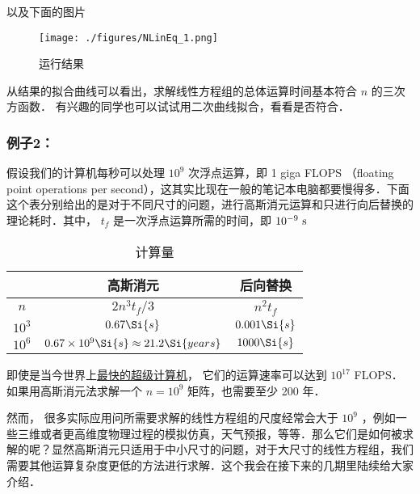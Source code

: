 以及下面的图片

\begin{figure}[ht]
\centering
\texttt{[image: ./figures/NLinEq\_1.png]}
\caption{运行结果} \label{NLinEq_fig1}
\end{figure}

从结果的拟合曲线可以看出，求解线性方程组的总体运算时间基本符合 $n$ 的三次方函数． 有兴趣的同学也可以试试用二次曲线拟合，看看是否符合．

\subsubsection{例子2：}

假设我们的计算机每秒可以处理 $10^9$ 次浮点运算，即 1 giga FLOPS （floating point operations per second），这其实比现在一般的笔记本电脑都要慢得多．下面这个表分别给出的是对于不同尺寸的问题，进行高斯消元运算和只进行向后替换的理论耗时．其中， $t_f$ 是一次浮点运算所需的时间，即 $10^{-9}~\rm{s}$ 

\begin{table}[ht]
\centering
\caption{计算量}\label{NLinEq_tab1}
\begin{tabular}{|c|c|c|}
\hline
 & 高斯消元 & 后向替换 \\
\hline
$n$ & $2n^3 t_f/3$ & $n^2 t_f$ \\
\hline
$10^3$ & $0.67\Si{s}$ & $0.001\Si{s}$ \\
\hline
$10^6$ & $0.67\times 10^9\Si{s} \approx 21.2 \Si{years}$ & $1000\Si{s}$ \\
\hline
\end{tabular}
\end{table}

即使是当今世界上\href{https://www.top500.org}{最快的超级计算机}， 它们的运算速率可以达到 $10^{17}$ FLOPS． 如果用高斯消元法求解一个 $n=10^9$ 矩阵，也需要至少 200 年．

然而， 很多实际应用问所需要求解的线性方程组的尺度经常会大于 $10^9$ ，例如一些三维或者更高维度物理过程的模拟仿真，天气预报，等等．那么它们是如何被求解的呢？显然高斯消元只适用于中小尺寸的问题，对于大尺寸的线性方程组，我们需要其他运算复杂度更低的方法进行求解．这个我会在接下来的几期里陆续给大家介绍．
